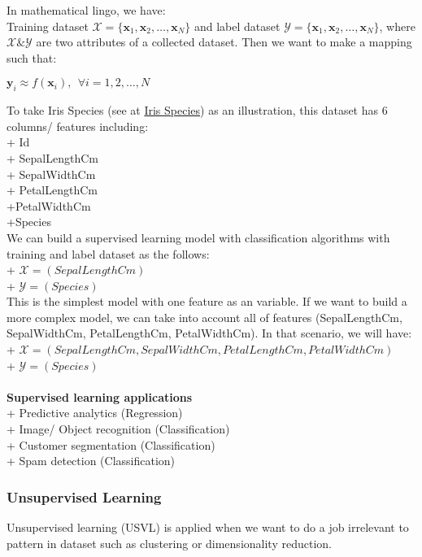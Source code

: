 \documentclass[12pt,a4paper]{article}
\begin{document}
\noindent In mathematical lingo, we have:\\
Training dataset $\mathcal{X} = \{\mathbf{x}_1, \mathbf{x}_2, \dots, \mathbf{x}_N\}$ and label dataset $\mathcal{Y} = \{\mathbf{x}_1, \mathbf{x}_2, \dots, \mathbf{x}_N\}$, where $\mathcal{X} \& \mathcal{Y}$ are two attributes of a collected dataset. Then we want to make a mapping such that:
\begin{center}
$\mathbf{y}_i \approx f(\mathbf{x}_i), ~~ \forall i = 1, 2, \dots, N$\\
\end{center}
\noindent
To take Iris Species (see at \hyperlink{https://www.kaggle.com/datasets/uciml/iris}{Iris Species}) as an illustration, this dataset has 6 columns/ features including:\\
\indent+ Id\\
\indent+ SepalLengthCm\\
\indent+ SepalWidthCm\\
\indent+ PetalLengthCm\\
\indent+PetalWidthCm\\
\indent+Species\\
We can build a supervised learning model with classification algorithms with training and label dataset as the follows:\\
\indent+ $\mathcal{X} = (SepalLengthCm)$\\
\indent+ $\mathcal{Y} = (Species)$\\
This is the simplest model with one feature as an variable. If we want to build a more complex model, we can take into account all of features (SepalLengthCm, SepalWidthCm, PetalLengthCm, PetalWidthCm). In that scenario, we will have:\\
\indent+ $\mathcal{X} = (SepalLengthCm, SepalWidthCm, PetalLengthCm, PetalWidthCm)$\\
\indent+ $\mathcal{Y} = (Species)$\\\\
\textbf{Supervised learning applications}\\
+ Predictive analytics (Regression)\\
+ Image/ Object recognition (Classification)\\
+ Customer segmentation (Classification)\\
+ Spam detection (Classification)\\

\subsubsection{Unsupervised Learning} %
Unsupervised learning (USVL) is applied when we want to do a job irrelevant to pattern in dataset such as clustering or dimensionality reduction.\\
\end{document}
